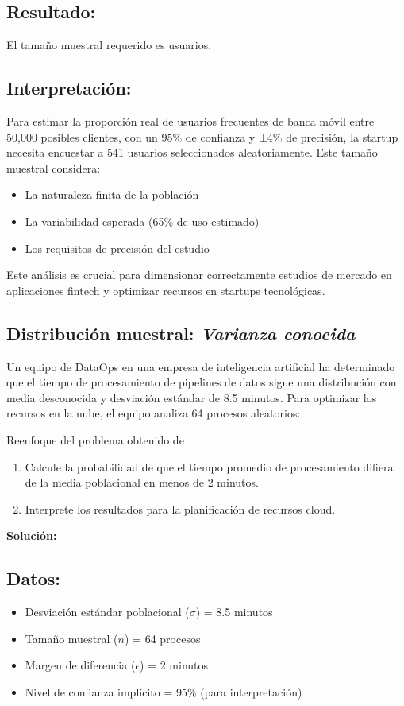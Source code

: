 \subsection*{Resultado:}
El tamaño muestral requerido es  usuarios.

\subsection*{Interpretación:}
Para estimar la proporción real de usuarios frecuentes de banca móvil entre 50,000 posibles clientes, con un 95\% de confianza y ±4\% de precisión, la startup necesita encuestar a 541 usuarios seleccionados aleatoriamente. Este tamaño muestral considera:
\begin{itemize}
    \item La naturaleza finita de la población
    \item La variabilidad esperada (65\% de uso estimado)
    \item Los requisitos de precisión del estudio
\end{itemize}

Este análisis es crucial para dimensionar correctamente estudios de mercado en aplicaciones fintech y optimizar recursos en startups tecnológicas.

\subsection{Distribución muestral: \textit{Varianza conocida}}

Un equipo de DataOps en una empresa de inteligencia artificial ha determinado que el tiempo de procesamiento de pipelines de datos sigue una distribución con media desconocida y desviación estándar de 8.5 minutos. Para optimizar los recursos en la nube, el equipo analiza 64 procesos aleatorios:

Reenfoque del problema obtenido de \cite{LopezRol}

\begin{enumerate}
    \item Calcule la probabilidad de que el tiempo promedio de procesamiento difiera de la media poblacional en menos de 2 minutos.
    \item Interprete los resultados para la planificación de recursos cloud.
\end{enumerate}

\textbf{Solución:}

\subsection*{Datos:}
\begin{itemize}
    \item Desviación estándar poblacional ($\sigma$) = 8.5 minutos
    \item Tamaño muestral ($n$) = 64 procesos
    \item Margen de diferencia ($\epsilon$) = 2 minutos
    \item Nivel de confianza implícito = 95\% (para interpretación)
\end{itemize}

